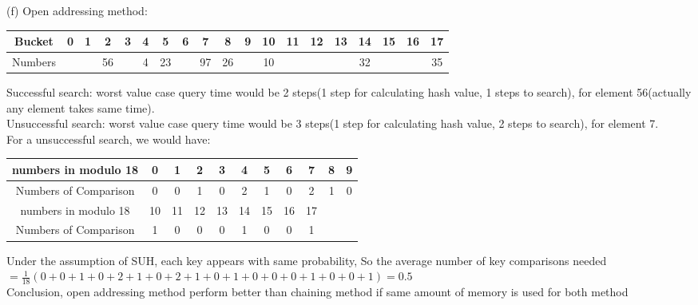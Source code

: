 \documentclass[12pt]{article}
\begin{document}
(f)
Open addressing method:\begin{center}
 \begin{tabular}{||c c c c c c c c c c c c c c c c c c c||} 
 \hline
Bucket & 0 & 1 & 2 &3&4&5&6&7&8&9 &10&11&12&13&14&15&16&17\\ [0.5ex] 
 \hline\hline
 Numbers &  & &56 & &4 &23&&97&26& &10&&&&32&&& 35 \\ 

\end{tabular}
\end{center}
Successful search: worst value case query time would be 2 steps(1 step for calculating hash value, 1 steps to search), for element 56(actually any element takes same time).\\
Unsuccessful search: worst value case query time would be 3 steps(1 step for calculating hash value, 2 steps to search), for element 7.\\
For a unsuccessful search, we would have:
\begin{center}
 \begin{tabular}{||c c c c c c c c c c c||} 
 \hline
numbers in modulo 18 & 0 & 1 & 2 &3&4&5&6&7&8&9 \\ [0.5ex] 
 \hline\hline
 Numbers of Comparison & 0 & 0&1 &0 &2 &1&0&2&1&0 \\ 
 \hline
 numbers in modulo 18 & 10 & 11 & 12 &13&14&15&16&17&& \\ [0.5ex] 
 \hline\hline
 Numbers of Comparison & 1 & 0&0 &0 &1 &0&0&1&& \\ 
 \hline
 \end{tabular}
\end{center}
Under the assumption of SUH, each key appears with same probability, So the average number of key comparisons needed $= \frac{1}{18}(0 + 0+ 1+0 +2 +1+0+2+1+0+ 1 + 0+0 +0 +1 +0+0+1) = 0.5$\\
Conclusion, open addressing method perform better than chaining method if same amount of memory is used for both method



\pagebreak
\section{}
\end{document}
